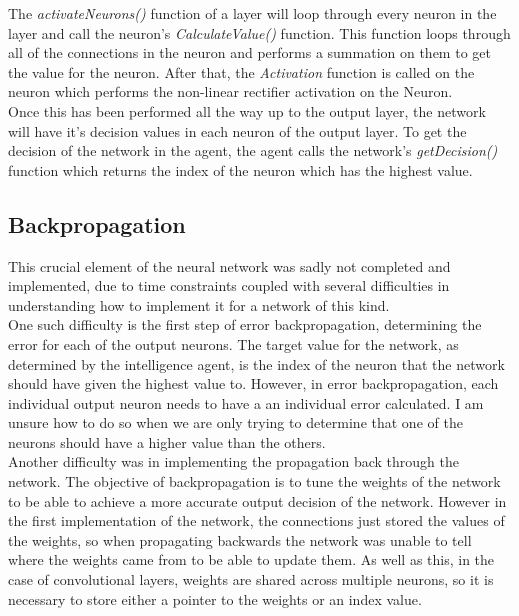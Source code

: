 \documentclass[10pt]{article}
\begin{document}
	 The \textit{activateNeurons()} function of a layer will loop through every neuron in the layer and call the neuron's \textit{CalculateValue()} function. This function loops through all of the connections in the neuron and performs a summation on them to get the value for the neuron. After that, the \textit{Activation} function is called on the neuron which performs the non-linear rectifier activation on the Neuron.\\
	
	Once this has been performed all the way up to the output layer, the network will have it's decision values in each neuron of the output layer. To get the decision of the network in the agent, the agent calls the network's \textit{getDecision()} function which returns the index of the neuron which has the highest value.
	\medskip
	
	\subsection{Backpropagation}
		This crucial element of the neural network was sadly not completed and implemented, due to time constraints coupled with several difficulties in understanding how to implement it for a network of this kind.\\		
		
		One such difficulty is the first step of error backpropagation, determining the error for each of the output neurons. The target value for the network, as determined by the intelligence agent, is the index of the neuron that the network should have given the highest value to. However, in error backpropagation, each individual output neuron needs to have a an individual error calculated. I am unsure how to do so when we are only trying to determine that one of the neurons should have a higher value than the others.\\
		
		Another difficulty was in implementing the propagation back through the network. The objective of backpropagation is to tune the weights of the network to be able to achieve a more accurate output decision of the network. However in the first implementation of the network, the connections just stored the values of the weights, so when propagating backwards the network was unable to tell where the weights came from to be able to update them. As well as this, in the case of convolutional layers, weights are shared across multiple neurons, so it is necessary to store either a pointer to the weights or an index value.\\
		
\end{document}

